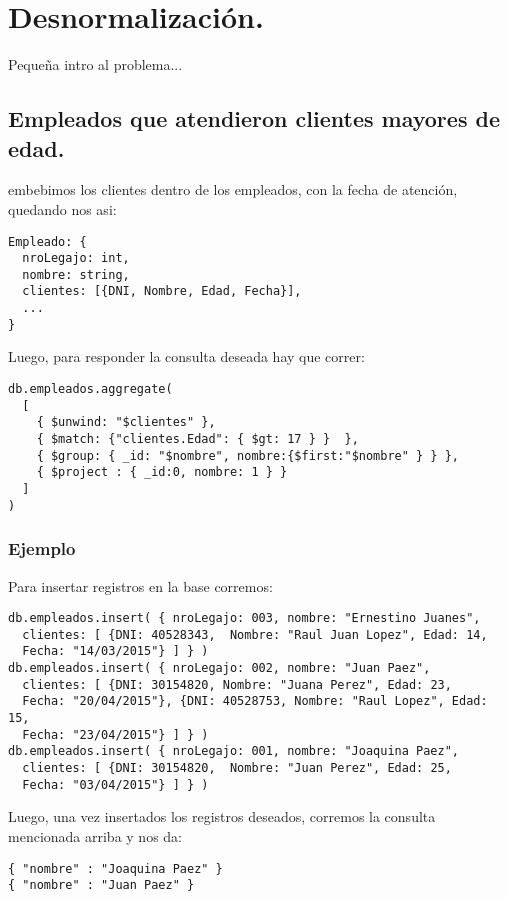 \section{Desnormalización.}
Pequeña intro al problema...

\subsection{Empleados que atendieron clientes mayores de edad.}

embebimos los clientes dentro de los empleados, con la fecha de atención, quedando nos asi:

\begin{lstlisting}
Empleado: {
  nroLegajo: int,
  nombre: string,
  clientes: [{DNI, Nombre, Edad, Fecha}],
  ...
}
\end{lstlisting}

Luego, para responder la consulta deseada hay que correr:

\begin{lstlisting}
db.empleados.aggregate(
  [
    { $unwind: "$clientes" },
    { $match: {"clientes.Edad": { $gt: 17 } }  },
    { $group: { _id: "$nombre", nombre:{$first:"$nombre" } } },
    { $project : { _id:0, nombre: 1 } }
  ]
)
\end{lstlisting}
\label{consulta-a}

\subsubsection{Ejemplo}

Para insertar registros en la base corremos:

\begin{lstlisting}
db.empleados.insert( { nroLegajo: 003, nombre: "Ernestino Juanes",
  clientes: [ {DNI: 40528343,  Nombre: "Raul Juan Lopez", Edad: 14,
  Fecha: "14/03/2015"} ] } )
db.empleados.insert( { nroLegajo: 002, nombre: "Juan Paez",
  clientes: [ {DNI: 30154820, Nombre: "Juana Perez", Edad: 23,
  Fecha: "20/04/2015"}, {DNI: 40528753, Nombre: "Raul Lopez", Edad: 15,
  Fecha: "23/04/2015"} ] } )
db.empleados.insert( { nroLegajo: 001, nombre: "Joaquina Paez",
  clientes: [ {DNI: 30154820,  Nombre: "Juan Perez", Edad: 25,
  Fecha: "03/04/2015"} ] } )
\end{lstlisting}

Luego, una vez insertados los registros deseados, corremos la consulta mencionada arriba y nos da:

\begin{lstlisting}
{ "nombre" : "Joaquina Paez" }
{ "nombre" : "Juan Paez" }
\end{lstlisting}


